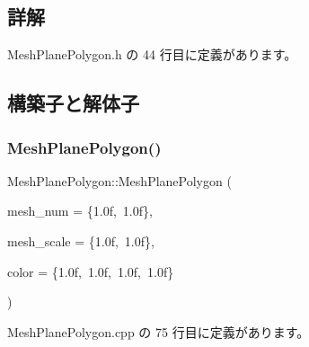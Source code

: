 \subsection{詳解}


 Mesh\+Plane\+Polygon.\+h の 44 行目に定義があります。



\subsection{構築子と解体子}
\mbox{\label{class_mesh_plane_polygon_a7db07104974799895b42997c71ba8d3e}} 
\subsubsection{\texorpdfstring{Mesh\+Plane\+Polygon()}{MeshPlanePolygon()}}
{\footnotesize\ttfamily Mesh\+Plane\+Polygon\+::\+Mesh\+Plane\+Polygon (\begin{DoxyParamCaption}\item[{\mbox{\hyperlink{_vector3_d_8h_a5ef6e95dfc5f9d3820b71772d99bbc25}{Vec2}}}]{mesh\+\_\+num = {\ttfamily \{1.0f,~1.0f\}},  }\item[{\mbox{\hyperlink{_vector3_d_8h_a5ef6e95dfc5f9d3820b71772d99bbc25}{Vec2}}}]{mesh\+\_\+scale = {\ttfamily \{1.0f,~1.0f\}},  }\item[{\mbox{\hyperlink{_vector3_d_8h_a680c30c4a07d86fe763c7e01169cd6cc}{X\+Color4}}}]{color = {\ttfamily \{1.0f,~1.0f,~1.0f,~1.0f\}} }\end{DoxyParamCaption})}



 Mesh\+Plane\+Polygon.\+cpp の 75 行目に定義があります。

